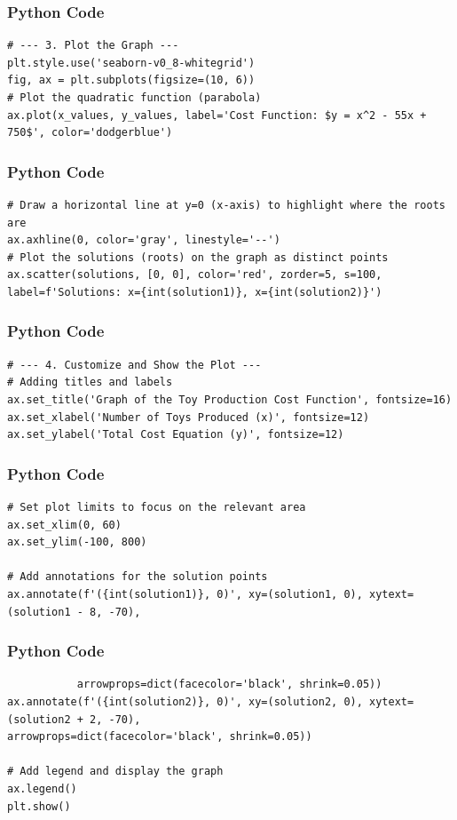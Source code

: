 \documentclass{beamer}
\begin{document}
\begin{frame}[fragile]
\frametitle{Python Code}
\begin{lstlisting}
# --- 3. Plot the Graph ---
plt.style.use('seaborn-v0_8-whitegrid')
fig, ax = plt.subplots(figsize=(10, 6))
# Plot the quadratic function (parabola)
ax.plot(x_values, y_values, label='Cost Function: $y = x^2 - 55x + 750$', color='dodgerblue')
\end{lstlisting}
\end{frame}

\begin{frame}[fragile]
\frametitle{Python Code}
\begin{lstlisting}
# Draw a horizontal line at y=0 (x-axis) to highlight where the roots are
ax.axhline(0, color='gray', linestyle='--')
# Plot the solutions (roots) on the graph as distinct points
ax.scatter(solutions, [0, 0], color='red', zorder=5, s=100, label=f'Solutions: x={int(solution1)}, x={int(solution2)}')
\end{lstlisting}
\end{frame}

\begin{frame}[fragile]
\frametitle{Python Code}
\begin{lstlisting}
# --- 4. Customize and Show the Plot ---
# Adding titles and labels
ax.set_title('Graph of the Toy Production Cost Function', fontsize=16)
ax.set_xlabel('Number of Toys Produced (x)', fontsize=12)
ax.set_ylabel('Total Cost Equation (y)', fontsize=12)
\end{lstlisting}
\end{frame}

\begin{frame}[fragile]
\frametitle{Python Code}
\begin{lstlisting}
# Set plot limits to focus on the relevant area
ax.set_xlim(0, 60)
ax.set_ylim(-100, 800)

# Add annotations for the solution points
ax.annotate(f'({int(solution1)}, 0)', xy=(solution1, 0), xytext=(solution1 - 8, -70),
 \end{lstlisting}
\end{frame}

\begin{frame}[fragile]
\frametitle{Python Code}
\begin{lstlisting}           arrowprops=dict(facecolor='black', shrink=0.05))
ax.annotate(f'({int(solution2)}, 0)', xy=(solution2, 0), xytext=(solution2 + 2, -70),
arrowprops=dict(facecolor='black', shrink=0.05))

# Add legend and display the graph
ax.legend()
plt.show()
\end{lstlisting}
\end{frame}
\end{document}
